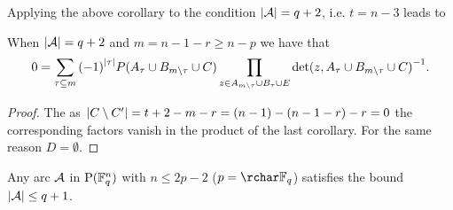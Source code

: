 Applying the above corollary to the condition $\left|\mathcal{A}\right|=q+2$, i.e. $t=n-3$ leads to

\begin{corollary}
    When $\left|\mathcal{A}\right|=q+2$ and $m=n-1-r\geq n-p$ we have that
    $$
  0 = \sum_{\tau\subseteq m}{{(-1)}^{\left|\tau\right|}P(A_{\tau}\cup B_{m\setminus\tau}\cup C)}\prod_{\substack{z\in A_{m\setminus\tau}\cup B_{\tau}\cup E}}{{\det(z,A_{\tau}\cup B_{m\setminus\tau}\cup C)}^{-1}}.
    $$
\end{corollary}

\begin{proof}
    The as $\left|C\setminus C'\right|=t+2-m-r=(n-1)-(n-1-r)-r=0$ the corresponding factors vanish in the product of the last corollary. For the same reason $D=\emptyset$.
\end{proof}

\begin{corollary}
    Any arc $\mathcal{A}$ in $\P(\field{q}^n)$ with $n\leq 2p-2$ ($p=\rchar\field{q}$) satisfies the bound $\left|\mathcal{A}\right|\leq q+1$.
\end{corollary}

